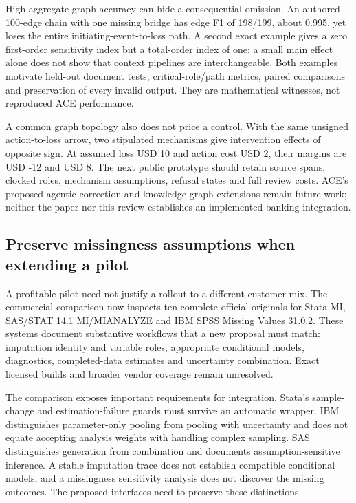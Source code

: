 High aggregate graph accuracy can hide a consequential omission. An
authored 100-edge chain with one missing bridge has edge F1 of 198/199,
about 0.995, yet loses the entire initiating-event-to-loss path. A
second exact example gives a zero first-order sensitivity index but a
total-order index of one: a small main effect alone does not show that
context pipelines are interchangeable. Both examples motivate held-out
document tests, critical-role/path metrics, paired comparisons and
preservation of every invalid output. They are mathematical witnesses,
not reproduced ACE performance. \citep{exec21_ace_reference}

A common graph topology also does not price a control. With the same
unsigned action-to-loss arrow, two stipulated mechanisms give
intervention effects of opposite sign. At assumed loss USD 10 and action
cost USD 2, their margins are USD -12 and USD 8. The next public
prototype should retain source spans, clocked roles, mechanism
assumptions, refusal states and full review costs. ACE's proposed
agentic correction and knowledge-graph extensions remain future work;
neither the paper nor this review establishes an implemented banking
integration. \citep{exec21_ace,exec21_ace_reference}

\hypertarget{preserve-missingness-assumptions-when-extending-a-pilot}{%
\subsection{Preserve missingness assumptions when extending a
pilot}\label{preserve-missingness-assumptions-when-extending-a-pilot}}

A profitable pilot need not justify a rollout to a different customer
mix. The commercial comparison now inspects ten complete official
originals for Stata MI, SAS/STAT 14.1 MI/MIANALYZE and IBM SPSS Missing
Values 31.0.2. These systems document substantive workflows that a new
proposal must match: imputation identity and variable roles, appropriate
conditional models, diagnostics, completed-data estimates and
uncertainty combination. Exact licensed builds and broader vendor
coverage remain unresolved.
\citep{exec21_transport_stata_mi,exec21_transport_stata_substantive,exec21_transport_sas_mi_intro,exec21_transport_spss_missing}

The comparison exposes important requirements for integration. Stata's
sample-change and estimation-failure guards must survive an automatic
wrapper. IBM distinguishes parameter-only pooling from pooling with
uncertainty and does not equate accepting analysis weights with handling
complex sampling. SAS distinguishes generation from combination and
documents assumption-sensitive inference. A stable imputation trace does
not establish compatible conditional models, and a missingness
sensitivity analysis does not discover the missing outcomes. The
proposed interfaces need to preserve these distinctions.
\citep{exec21_transport_stata_estimate,exec21_transport_stata_chained,exec21_transport_sas_mianalyze_intro,exec21_transport_sas_assumptions,exec21_transport_sas_combining,exec21_transport_sas_sensitivity}


